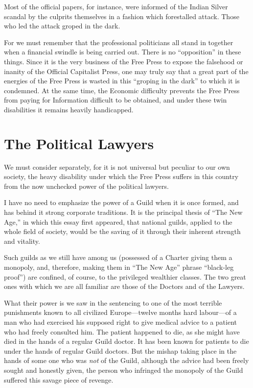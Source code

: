 \documentclass{book}
\begin{document}
Most of the official papers, for instance, were informed of the Indian Silver scandal by the culprits themselves in a fashion which forestalled attack. Those who led the attack groped in the dark.

For we must remember that the professional politicians all stand in together when a financial swindle is being carried out. There is no “opposition” in these things. Since it is the very business of the Free Press to expose the falsehood or inanity of the Official Capitalist Press, one may truly say that a great part of the energies of the Free Press is wasted in this “groping in the dark” to which it is condemned. At the same time, the Economic difficulty prevents the Free Press from paying for Information difficult to be obtained, and under these twin disabilities it remains heavily handicapped.

\section*{The Political Lawyers}
We must consider separately, for it is not universal but peculiar to our own society, the heavy disability under which the Free Press suffers in this country from the now unchecked power of the political lawyers.

I have no need to emphasize the power of a Guild when it is once formed, and has behind it strong corporate traditions. It is the principal thesis of “The New Age,” in which this essay first appeared, that national guilds, applied to the whole field of society, would be the saving of it through their inherent strength and vitality.

Such guilds as we still have among us (possessed of a Charter giving them a monopoly, and, therefore, making them in “The New Age” phrase “black-leg proof”) are confined, of course, to the privileged wealthier classes. The two great ones with which we are all familiar are those of the Doctors and of the Lawyers.

What their power is we saw in the sentencing to one of the most terrible punishments known to all civilized Europe—twelve months hard labour—of a man who had exercised his supposed right to give medical advice to a patient who had freely consulted him. The patient happened to die, as she might have died in the hands of a regular Guild doctor. It has been known for patients to die under the hands of regular Guild doctors. But the mishap taking place in the hands of some one who was \emph{not} of the Guild, although the advice had been freely sought and honestly given, the person who infringed the monopoly of the Guild suffered this savage piece of revenge.
\end{document}
